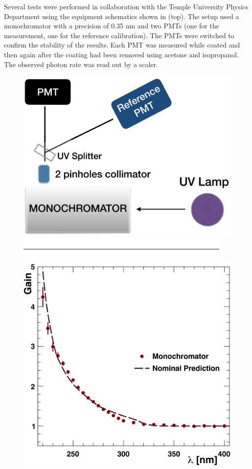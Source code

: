 Several tests were performed in collaboration with the Temple University Physics Department using the equipment schematics
shown in  (top). The setup used a monochromator with a precision of 0.35 nm and two PMTs
(one for the measurement, one for the   reference calibration). The PMTs were switched to confirm the stability of the results.
Each PMT was measured while coated and then again after the coating had been removed using acetone and isopropanol.
The observed photon rate was read out by a scaler.

\begin{figure}
	\centering
	\includegraphics[width=0.95\columnwidth, height=0.65\columnwidth]{img/pmtTestingSetup.png}
	\includegraphics[width=0.99\columnwidth, keepaspectratio]{img/blank.png}
	\includegraphics[width=0.99\columnwidth, keepaspectratio]{img/ptQEResults.png}

\end{figure}
